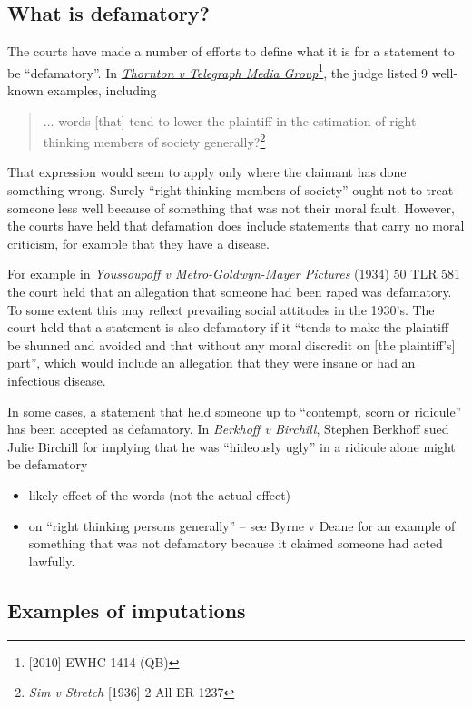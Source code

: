 \documentclass[]{article}
\begin{document}
\subsection{What is defamatory?}

The courts have made a number of efforts to define what it is for a statement to be ``defamatory''. In \href{http://www.bailii.org/ew/cases/EWHC/QB/2010/1414.html}{\it Thornton v Telegraph Media Group}\footnote{[2010] EWHC 1414 (QB)}, the judge listed 9 well-known examples, including

\begin{quote}
... words [that] tend to lower the plaintiff in the estimation of right-thinking members of society generally?\footnote{{\it Sim v Stretch} [1936] 2 All ER 1237}
\end{quote}

That expression would seem to apply only where the claimant has done something wrong. Surely ``right-thinking members of society'' ought not to treat someone less well because of something that was not their moral fault. However, the courts have held that defamation does include statements that carry no moral criticism, for example that they have a disease.

For example in {\it Youssoupoff v Metro-Goldwyn-Mayer Pictures} (1934) 50 TLR 581 the court held that an allegation that someone had been raped was defamatory. To some extent this may reflect prevailing social attitudes in the 1930's. The court held that a statement is also defamatory if it ``tends to make the plaintiff be shunned and avoided and that without any moral discredit on [the plaintiff's] part'', which would include an allegation that they were insane or had an infectious disease.

In some cases, a statement that held someone up to ``contempt, scorn or ridicule'' has been accepted as defamatory. In {\it Berkhoff v Birchill}, Stephen Berkhoff sued Julie Birchill for implying that he was ``hideously ugly'' in a  ridicule alone might be defamatory

\begin{itemize}
\item
  likely effect of the words (not the actual effect)
\item
  on ``right thinking persons generally'' -- see Byrne v Deane for an
  example of something that was not defamatory because it claimed
  someone had acted lawfully.
\end{itemize}

\subsection{Examples of imputations}
\end{document}
